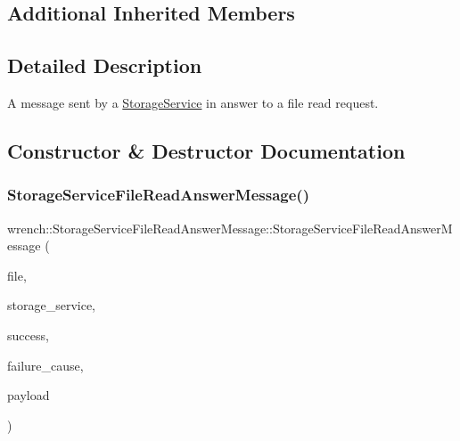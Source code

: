 \subsection*{Additional Inherited Members}


\subsection{Detailed Description}
A message sent by a \hyperlink{classwrench_1_1_storage_service}{Storage\+Service} in answer to a file read request. 

\subsection{Constructor \& Destructor Documentation}
\mbox{\label{classwrench_1_1_storage_service_file_read_answer_message_a7150fa53474a18fe479792ef639d3ee1}} 
\subsubsection{\texorpdfstring{Storage\+Service\+File\+Read\+Answer\+Message()}{StorageServiceFileReadAnswerMessage()}}
{\footnotesize\ttfamily wrench\+::\+Storage\+Service\+File\+Read\+Answer\+Message\+::\+Storage\+Service\+File\+Read\+Answer\+Message (\begin{DoxyParamCaption}\item[{\hyperlink{classwrench_1_1_workflow_file}{Workflow\+File} $\ast$}]{file,  }\item[{\hyperlink{classwrench_1_1_storage_service}{Storage\+Service} $\ast$}]{storage\+\_\+service,  }\item[{bool}]{success,  }\item[{std\+::shared\+\_\+ptr$<$ \hyperlink{classwrench_1_1_failure_cause}{Failure\+Cause} $>$}]{failure\+\_\+cause,  }\item[{double}]{payload }\end{DoxyParamCaption})}



